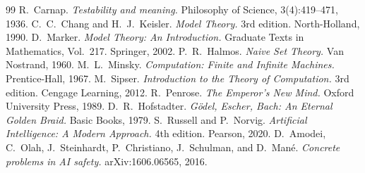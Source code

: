 \documentclass[12pt,a4paper]{article}
\theoremstyle{plain}
\theoremstyle{definition}
\theoremstyle{remark}
\begin{document}
\begin{thebibliography}{99}
R.~Carnap.
\textit{Testability and meaning.}
Philosophy of Science, 3(4):419--471, 1936.
C.~C.~Chang and H.~J.~Keisler.
\textit{Model Theory.}
3rd edition. North-Holland, 1990.
D.~Marker.
\textit{Model Theory: An Introduction.}
Graduate Texts in Mathematics, Vol.~217. Springer, 2002.
P.~R.~Halmos.
\textit{Naive Set Theory.}
Van Nostrand, 1960.
M.~L.~Minsky.
\textit{Computation: Finite and Infinite Machines.}
Prentice-Hall, 1967.
M.~Sipser.
\textit{Introduction to the Theory of Computation.}
3rd edition. Cengage Learning, 2012.
R.~Penrose.
\textit{The Emperor's New Mind.}
Oxford University Press, 1989.
D.~R.~Hofstadter.
\textit{G\"odel, Escher, Bach: An Eternal Golden Braid.}
Basic Books, 1979.
S.~Russell and P.~Norvig.
\textit{Artificial Intelligence: A Modern Approach.}
4th edition. Pearson, 2020.
D.~Amodei, C.~Olah, J.~Steinhardt, P.~Christiano, J.~Schulman, and D.~Man\'e.
\textit{Concrete problems in AI safety.}
arXiv:1606.06565, 2016.
\end{thebibliography}
\end{document}
